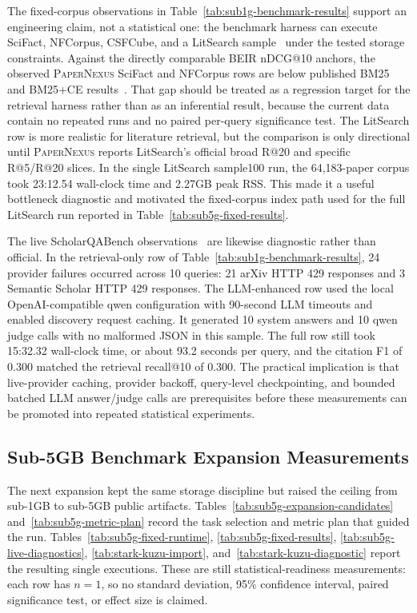 \documentclass[11pt]{article}
\newcommand{\papernexus}{\textsc{PaperNexus}}
\begin{document}
The fixed-corpus observations in Table~\ref{tab:sub1g-benchmark-results} support an engineering claim, not a statistical one: the benchmark harness can execute SciFact, NFCorpus, CSFCube, and a LitSearch sample~\citep{litsearch} under the tested storage constraints. Against the directly comparable BEIR nDCG@10 anchors, the observed \papernexus{} SciFact and NFCorpus rows are below published BM25 and BM25+CE results~\citep{beir}. That gap should be treated as a regression target for the retrieval harness rather than as an inferential result, because the current data contain no repeated runs and no paired per-query significance test. The LitSearch row is more realistic for literature retrieval, but the comparison is only directional until \papernexus{} reports LitSearch's official broad R@20 and specific R@5/R@20 slices. In the single LitSearch sample100 run, the 64,183-paper corpus took 23:12.54 wall-clock time and 2.27GB peak RSS. This made it a useful bottleneck diagnostic and motivated the fixed-corpus index path used for the full LitSearch run reported in Table~\ref{tab:sub5g-fixed-results}.

The live ScholarQABench observations~\citep{scholarqabench,openscholar} are likewise diagnostic rather than official. In the retrieval-only row of Table~\ref{tab:sub1g-benchmark-results}, 24 provider failures occurred across 10 queries: 21 arXiv HTTP 429 responses and 3 Semantic Scholar HTTP 429 responses. The LLM-enhanced row used the local OpenAI-compatible qwen configuration with 90-second LLM timeouts and enabled discovery request caching. It generated 10 system answers and 10 qwen judge calls with no malformed JSON in this sample. The full row still took 15:32.32 wall-clock time, or about 93.2 seconds per query, and the citation F1 of 0.300 matched the retrieval recall@10 of 0.300. The practical implication is that live-provider caching, provider backoff, query-level checkpointing, and bounded batched LLM answer/judge calls are prerequisites before these measurements can be promoted into repeated statistical experiments.

\subsection{Sub-5GB Benchmark Expansion Measurements}

The next expansion kept the same storage discipline but raised the ceiling from sub-1GB to sub-5GB public artifacts. Tables~\ref{tab:sub5g-expansion-candidates} and~\ref{tab:sub5g-metric-plan} record the task selection and metric plan that guided the run. Tables~\ref{tab:sub5g-fixed-runtime}, \ref{tab:sub5g-fixed-results}, \ref{tab:sub5g-live-diagnostics}, \ref{tab:stark-kuzu-import}, and~\ref{tab:stark-kuzu-diagnostic} report the resulting single executions. These are still statistical-readiness measurements: each row has \(n=1\), so no standard deviation, 95\% confidence interval, paired significance test, or effect size is claimed.
\end{document}
